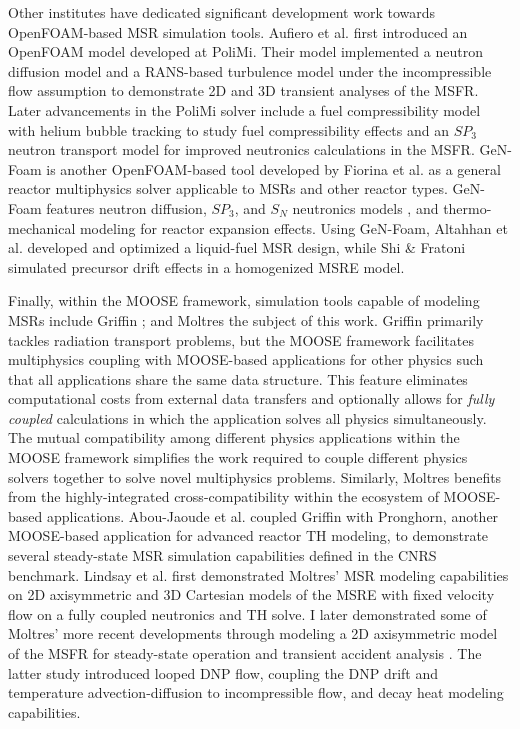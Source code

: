 Other institutes have dedicated significant development work towards
OpenFOAM-based \gls{MSR} simulation tools. Aufiero et al.
\cite{aufiero_development_2014} first introduced an OpenFOAM model developed
at \gls{PoliMi}. Their model implemented a neutron diffusion model and a
\gls{RANS}-based turbulence model under the incompressible flow assumption to demonstrate 2D
and 3D transient analyses of the \gls{MSFR}. Later advancements in the
\gls{PoliMi} solver include a fuel compressibility model with helium bubble
tracking to study fuel compressibility effects
\cite{cervi_development_2019} and an $SP_3$ neutron transport
model for improved neutronics calculations \cite{cervi_development_2019-1} in
the \gls{MSFR}. GeN-Foam is another OpenFOAM-based tool developed by Fiorina
et al. \cite{fiorina_gen-foam_2015} as a general reactor multiphysics solver
applicable to \glspl{MSR} and other reactor types. GeN-Foam features neutron
diffusion, $SP_3$, and $S_N$ neutronics models
\cite{fiorina_development_2016,fiorina_gen-foam_2015,fiorina_detailed_2019},
and thermo-mechanical modeling for reactor expansion effects. Using GeN-Foam,
Altahhan et al. \cite{altahhan_preliminary_2020} developed and optimized a
liquid-fuel \gls{MSR} design, while Shi \& Fratoni \cite{shi_gen-foam_2021}
simulated precursor drift effects in a homogenized \gls{MSRE} model.

Finally, within the \gls{MOOSE} framework, simulation tools capable of modeling
\glspl{MSR} include Griffin \cite{abou-jaoude_coupled_2020}; and Moltres
\cite{lindsay_moltres_2017}\textemdash the subject of this work.
Griffin primarily tackles radiation transport problems, but the \gls{MOOSE}
framework facilitates multiphysics coupling with \gls{MOOSE}-based applications for other physics
such that all applications share the same data structure. This feature eliminates
computational costs from external data transfers and optionally allows for
\textit{fully coupled} calculations in which the application solves all physics
simultaneously. The mutual compatibility among different physics applications within the
\gls{MOOSE} framework simplifies the work required to couple
different physics solvers together to solve novel multiphysics problems. Similarly,
Moltres benefits from the highly-integrated cross-compatibility
within the ecosystem of \gls{MOOSE}-based applications. Abou-Jaoude et al.
\cite{abou-jaoude_coupled_2020} coupled Griffin with Pronghorn, another
\gls{MOOSE}-based application for advanced reactor \gls{TH} modeling, to
demonstrate several steady-state \gls{MSR} simulation capabilities defined in
the CNRS benchmark. Lindsay et al.
\cite{lindsay_introduction_2018} first demonstrated Moltres' \gls{MSR} modeling
capabilities on 2D axisymmetric and 3D Cartesian models of the \gls{MSRE} with
fixed velocity flow on a fully coupled neutronics and \gls{TH} solve.
I later demonstrated some of Moltres' more recent developments through
modeling a 2D axisymmetric model of the \gls{MSFR} for steady-state operation
and transient accident analysis \cite{park_advancement_2020}. The latter study
introduced looped \gls{DNP} flow, coupling the \gls{DNP} drift and temperature 
advection-diffusion to incompressible flow, and decay heat modeling
capabilities.

